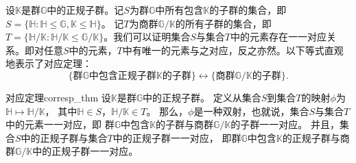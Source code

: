 设$\mathbb{K}$是群$\mathbb{G}$中的正规子群。记$S$为群$\mathbb{G}$中所有包含$\mathbb{K}$的子群的集合，即
$S = \{\mathbb{H}: \mathbb{H} \le \mathbb{G}, \mathbb{K} \le \mathbb{H} \}$。
记$T$为商群$\mathbb{G}/\mathbb{K}$的所有子群的集合，即
$T = \{\mathbb{H}/\mathbb{K}: \mathbb{H}/\mathbb{K} \le \mathbb{G}/\mathbb{K} \}$。我们可以证明集合$S$与集合$T$中的元素存在一一对应关系。即对任意$S$中的元素，$T$中有唯一的元素与之对应，反之亦然。以下等式直观地表示了对应定理：
\[
\{ \text{群}\mathbb{G}\text{中包含正规子群}\mathbb{K}\text{的子群}\} \leftrightarrow \{\text{商群}\mathbb{G}/\mathbb{K}\text{的子群}\}.
\]

\begin{theorem}{对应定理}{corresp_thm}
 设$\mathbb{K}$是群$\mathbb{G}$中的正规子群。
 定义从集合$S$到集合$T$的映射$\phi$为$\mathbb{H} \mapsto \mathbb{H}/\mathbb{K}$，
 其中$\mathbb{H} \in S$，$\mathbb{H}/\mathbb{K} \in T$。
 那么，$\phi$是一种双射，也就说，集合$S$与集合$T$中的元素一一对应，即
 群$\mathbb{G}$中包含$\mathbb{K}$的子群与商群$\mathbb{G}/\mathbb{K}$的子群一一对应。
 并且，集合$S$中的正规子群与集合$T$中的正规子群一一对应，
 即群$\mathbb{G}$中包含$\mathbb{K}$的正规子群与商群$\mathbb{G}/\mathbb{K}$中的正规子群一一对应。 
\end{theorem}
	

